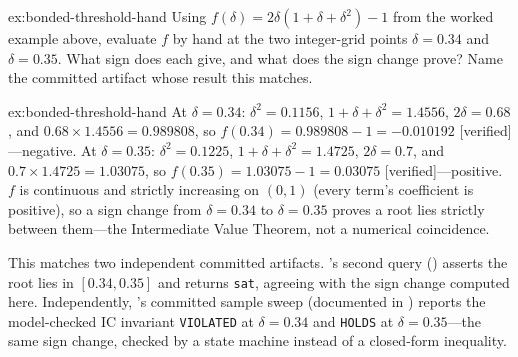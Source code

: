 \documentclass[11pt,a4paper]{article}
\theoremstyle{definition}
\theoremstyle{remark}
\begin{document}
\begin{pdexercise}[kind=Trace,rating=2]{ex:bonded-threshold-hand}
Using $f(\delta)=2\delta(1+\delta+\delta^2)-1$ from the worked example above, evaluate $f$ by hand at the two integer-grid points $\delta=0.34$ and $\delta=0.35$. What sign does each give, and what does the sign change prove? Name the committed artifact whose result this matches.
\end{pdexercise}
\begin{pdsolution}{ex:bonded-threshold-hand}
At $\delta=0.34$: $\delta^2=0.1156$, $1+\delta+\delta^2=1.4556$, $2\delta=0.68$, and $0.68\times1.4556=0.989808$, so $f(0.34)=0.989808-1=-0.010192$ [verified]---negative. At $\delta=0.35$: $\delta^2=0.1225$, $1+\delta+\delta^2=1.4725$, $2\delta=0.7$, and $0.7\times1.4725=1.03075$, so $f(0.35)=1.03075-1=0.03075$ [verified]---positive. $f$ is continuous and strictly increasing on $(0,1)$ (every term's coefficient is positive), so a sign change from $\delta=0.34$ to $\delta=0.35$ proves a root lies strictly between them---the Intermediate Value Theorem, not a numerical coincidence.

This matches two independent committed artifacts. 's second query () asserts the root lies in $[0.34, 0.35]$ and returns \texttt{sat}, agreeing with the sign change computed here. Independently, 's committed sample sweep (documented in ) reports the model-checked IC invariant \texttt{VIOLATED} at $\delta=0.34$ and \texttt{HOLDS} at $\delta=0.35$---the same sign change, checked by a state machine instead of a closed-form inequality.
\end{pdsolution}
\end{document}
